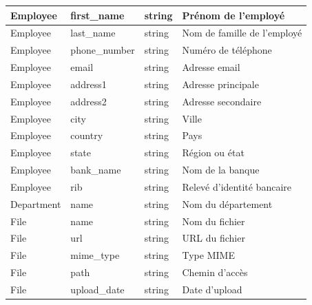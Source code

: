 \begin{longtable}{|p{3.5cm}|p{3.5cm}|p{3cm}|p{5cm}|}
    Employee                 & first\_name                & string                      & Prénom de l'employé  \\ \hline Employee &
    last\_name               & string                     & Nom de famille de l'employé                        \\ \hline Employee &
    phone\_number            & string                     & Numéro de téléphone                                \\ \hline Employee & email                             &
    string                   & Adresse email                                                                   \\ \hline Employee & address1 & string & Adresse
    principale                                                                                                 \\ \hline Employee & address2 & string & Adresse secondaire \\
    \hline Employee          & city                       & string                      & Ville                \\ \hline Employee & country & string &
    Pays                                                                                                       \\ \hline Employee & state & string & Région ou état \\ \hline Employee &
    bank\_name               & string                     & Nom de la banque                                   \\ \hline Employee & rib & string &
    Relevé d'identité bancaire                                                                                 \\ \hline

    Department               & name                       & string                      & Nom du département   \\ \hline

    File                     & name                       & string                      & Nom du fichier       \\ \hline File & url & string & URL du
    fichier                                                                                                    \\ \hline File & mime\_type & string & Type MIME \\ \hline File & path
                             & string                     & Chemin d'accès                                     \\ \hline File & upload\_date & string & Date
    d'upload                                                                                                   \\ \hline


\end{longtable}

